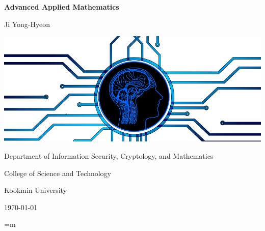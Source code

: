 \documentclass[12pt,openany]{book}
\theoremstyle{definition}
\begin{document}
	
	\begin{titlepage}
		\begin{center}
			{\Huge\textsf{\textbf{Advanced Applied Mathematics}}\par}
			\vspace{0.5in}
			{\Large Ji Yong-Hyeon\par}
			\vspace{1in}
			\includegraphics[scale=.5]{aam.png}\par
			\vspace{1in}
			{Department of Information Security, Cryptology, and Mathematics\par}
			{College of Science and Technology\par}
			{Kookmin University\par}
			\vspace{.25in}
			{\large \today\par}
		\end{center}
	\end{titlepage}
	

	
	\tableofcontents
	=m
	\mainmatter
	
\end{document}
